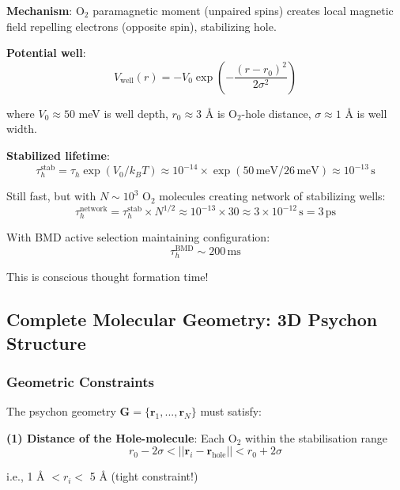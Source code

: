 \documentclass[11pt,onecolumn]{article}
\begin{document}
\textbf{Mechanism}: O$_2$ paramagnetic moment (unpaired spins) creates local magnetic field repelling electrons (opposite spin), stabilizing hole.

\textbf{Potential well}:
\begin{equation}
V_{\text{well}}(r) = -V_0 \exp\left(-\frac{(r - r_0)^2}{2\sigma^2}\right)
\end{equation}

where $V_0 \approx 50$ meV is well depth, $r_0 \approx 3$ Å is O$_2$-hole distance, $\sigma \approx 1$ Å is well width.

\textbf{Stabilized lifetime}:
\begin{equation}
\tau_h^{\text{stab}} = \tau_h \exp(V_0 / k_B T) \approx 10^{-14} \times \exp(50\,\text{meV} / 26\,\text{meV}) \approx 10^{-13}\,\text{s}
\end{equation}

Still fast, but with $N \sim 10^3$ O$_2$ molecules creating network of stabilizing wells:
\begin{equation}
\tau_h^{\text{network}} = \tau_h^{\text{stab}} \times N^{1/2} \approx 10^{-13} \times 30 \approx 3 \times 10^{-12}\,\text{s} = 3\,\text{ps}
\end{equation}

With BMD active selection maintaining configuration:
\begin{equation}
\tau_h^{\text{BMD}} \sim 200\,\text{ms}
\end{equation}

This is conscious thought formation time!

\subsection{Complete Molecular Geometry: 3D Psychon Structure}

\subsubsection{Geometric Constraints}

The psychon geometry $\mathbf{G} = \{\mathbf{r}_1, ..., \mathbf{r}_N\}$ must satisfy:

\textbf{(1) Distance of the Hole-molecule}: Each O$_2$ within the stabilisation range
\begin{equation}
r_{0} - 2\sigma < ||\mathbf{r}_i - \mathbf{r}_{\text{hole}}|| < r_0 + 2\sigma
\end{equation}

i.e., 1 Å $< r_i <$ 5 Å (tight constraint!)
\end{document}
